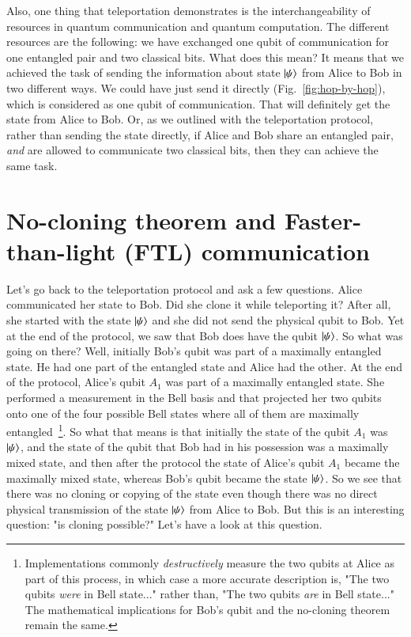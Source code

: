 Also, one thing that teleportation demonstrates is the interchangeability of resources in quantum communication and quantum computation. The different resources are the following: we have exchanged one qubit of communication for one entangled pair and two classical bits. What does this mean? It means that we achieved the task of sending the information about state $\left| \psi \right\rangle$ from Alice to Bob in two different ways. We could have just send it directly (Fig.~\ref{fig:hop-by-hop}), which is considered as one qubit of communication. That will definitely get the state from Alice to Bob. Or, as we outlined with the teleportation protocol, rather than sending the state directly, if Alice and Bob share an entangled pair, \emph{and} are allowed to communicate two classical bits, then they can achieve the same task.

\section{No-cloning theorem and Faster-than-light (FTL) communication}
\label{sec:8-3_no-cloning}

Let's go back to the teleportation protocol and ask a few questions. Alice communicated her state to Bob. Did she clone it while teleporting it? After all, she started with the state $\left| \psi \right\rangle$ and she did not send the physical qubit to Bob. Yet at the end of the protocol, we saw that Bob does have the qubit $\left| \psi \right\rangle$. So what was going on there? Well, initially Bob's qubit was part of a maximally entangled state. He had one part of the entangled state and Alice had the other. At the end of the protocol, Alice's qubit $A_1$ was part of a maximally entangled state. She performed a measurement in the Bell basis and that projected her two qubits onto one of the four possible Bell states where all of them are maximally entangled~\footnote{Implementations commonly \emph{destructively} measure the two qubits at Alice as part of this process, in which case a more accurate description is, "The two qubits \emph{were} in Bell state..." rather than, "The two qubits \emph{are} in Bell state..." The mathematical implications for Bob's qubit and the no-cloning theorem remain the same.}. So what that means is that initially the state of the qubit $A_1$ was $\left| \psi \right\rangle$, and the state of the qubit that Bob had in his possession was a maximally mixed state, and then after the protocol the state of Alice's qubit $A_1$ became the maximally mixed state, whereas Bob's qubit became the state $\left| \psi \right\rangle$. So we see that there was no cloning or copying of the state even though there was no direct physical transmission of the state $\left| \psi \right\rangle$ from Alice to Bob. But this is an interesting question: "is cloning possible?"  Let's have a look at this question.


